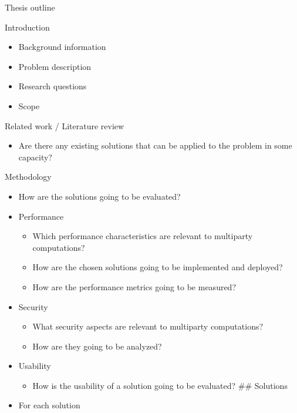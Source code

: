 \begin{frame}{Thesis outline}
\protect\hypertarget{thesis-outline}{}
\begin{block}{Introduction}
\protect\hypertarget{introduction}{}
\begin{itemize}
\tightlist
\item
  Background information
\item
  Problem description
\item
  Research questions
\item
  Scope
\end{itemize}
\end{block}

\begin{block}{Related work / Literature review}
\protect\hypertarget{related-work-literature-review}{}
\begin{itemize}
\tightlist
\item
  Are there any existing solutions that can be applied to the problem in
  some capacity?
\end{itemize}
\end{block}

\begin{block}{Methodology}
\protect\hypertarget{methodology}{}
\begin{itemize}
\tightlist
\item
  How are the solutions going to be evaluated?
\item
  Performance

  \begin{itemize}
  \tightlist
  \item
    Which performance characteristics are relevant to multiparty
    computations?
  \item
    How are the chosen solutions going to be implemented and deployed?
  \item
    How are the performance metrics going to be measured?
  \end{itemize}
\item
  Security

  \begin{itemize}
  \tightlist
  \item
    What security aspects are relevant to multiparty computations?
  \item
    How are they going to be analyzed?
  \end{itemize}
\item
  Usability

  \begin{itemize}
  \tightlist
  \item
    How is the usability of a solution going to be evaluated? \#\#
    Solutions
  \end{itemize}
\item
  For each solution


\end{itemize}
\end{block}
\end{frame}
